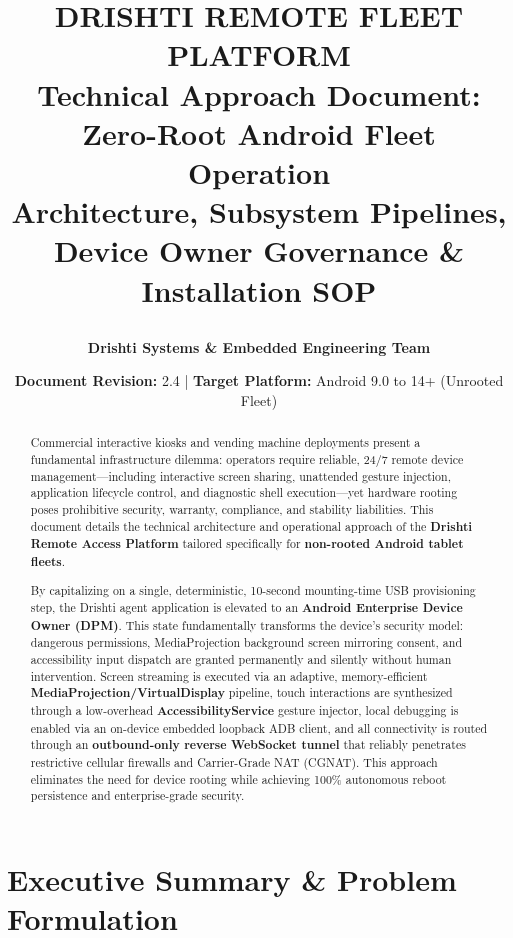 \documentclass[11pt,a4paper]{article}
\title{
    \vspace{-1.5cm}
    \begin{tcolorbox}[colback=navyPrimary,colframe=navyPrimary,arc=3mm,center,valign=center,top=10pt,bottom=10pt]
        \centering
        {\color{white}\Huge \textbf{DRISHTI REMOTE FLEET PLATFORM}}\\[6pt]
        {\color{tealAccent}\Large \textbf{Technical Approach Document: Zero-Root Android Fleet Operation}}\\[4pt]
        {\color{white}\small Architecture, Subsystem Pipelines, Device Owner Governance \& Installation SOP}
    \end{tcolorbox}
    \vspace{-0.5cm}
}
\author{\textbf{Drishti Systems \& Embedded Engineering Team}}
\date{\textbf{Document Revision:} 2.4 \quad | \quad \textbf{Target Platform:} Android 9.0 to 14+ (Unrooted Fleet)}
\begin{document}
\maketitle
\thispagestyle{fancy}

\begin{abstract}
\noindent Commercial interactive kiosks and vending machine deployments present a fundamental infrastructure dilemma: operators require reliable, 24/7 remote device management---including interactive screen sharing, unattended gesture injection, application lifecycle control, and diagnostic shell execution---yet hardware rooting poses prohibitive security, warranty, compliance, and stability liabilities. This document details the technical architecture and operational approach of the \textbf{Drishti Remote Access Platform} tailored specifically for \textbf{non-rooted Android tablet fleets}. 

By capitalizing on a single, deterministic, 10-second mounting-time USB provisioning step, the Drishti agent application is elevated to an \textbf{Android Enterprise Device Owner (DPM)}. This state fundamentally transforms the device's security model: dangerous permissions, MediaProjection background screen mirroring consent, and accessibility input dispatch are granted permanently and silently without human intervention. Screen streaming is executed via an adaptive, memory-efficient \textbf{MediaProjection/VirtualDisplay} pipeline, touch interactions are synthesized through a low-overhead \textbf{AccessibilityService} gesture injector, local debugging is enabled via an on-device embedded loopback ADB client, and all connectivity is routed through an \textbf{outbound-only reverse WebSocket tunnel} that reliably penetrates restrictive cellular firewalls and Carrier-Grade NAT (CGNAT). This approach eliminates the need for device rooting while achieving 100\% autonomous reboot persistence and enterprise-grade security.
\end{abstract}

\vspace{0.2cm}
\tableofcontents
\vspace{0.4cm}

\section{Executive Summary \& Problem Formulation}
\end{document}
